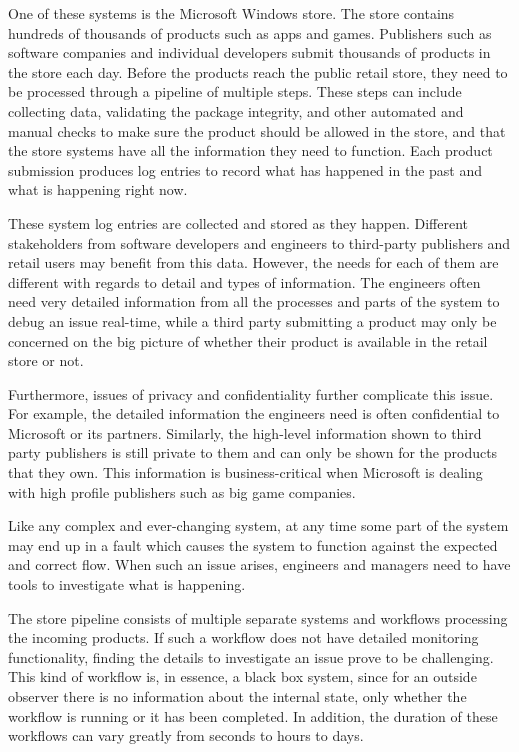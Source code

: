 \documentclass[english,12pt,a4paper,pdftex,sci,utf8]{aaltothesis}
\begin{document}
One of these systems is the Microsoft Windows store. The store contains hundreds of thousands of products
such as apps and games. Publishers such as software companies and individual developers submit thousands of 
products in the store each day. Before the products reach the public retail store, they need to be processed
through a pipeline of multiple steps. These steps can include collecting data, validating the package integrity, and
other automated and manual checks to make sure the product should be allowed in the store, 
and that the store systems have all the information they need to function.
Each product submission produces log entries to record what has happened in the past and what is happening right now.

These system log entries are collected and stored as they happen. 
Different stakeholders from software developers and engineers to third-party publishers and retail users 
may benefit from this data. However, the needs for each of them are
different with regards to detail and types of information.
The engineers often need very detailed information from all the processes and parts of the system to debug an issue real-time,
while a third party submitting a product may only be concerned on the big picture of whether their 
product is available in the retail store or not.

Furthermore, issues of privacy and confidentiality further complicate this issue.
For example, the detailed information the engineers need is often confidential to Microsoft or its partners.
Similarly, the high-level information shown to third party publishers is still private to them 
and can only be shown for the products that they own.
This information is business-critical when Microsoft is dealing with high profile publishers such as big game companies.

Like any complex and ever-changing system, at any time some part of the system may end up in a fault
which causes the system to function against the expected and correct flow.
When such an issue arises, engineers and managers need to have tools to investigate what is happening. 

The store pipeline consists of multiple separate systems and workflows processing the incoming products.
If such a workflow does not have detailed monitoring functionality, 
finding the details to investigate an issue prove to be challenging.
This kind of workflow is, in essence, a black box system, since for an outside observer there is no information
about the internal state, only whether the workflow is running or it has been completed.
In addition, the duration of these workflows can vary greatly from seconds to hours to days. 
\end{document}
